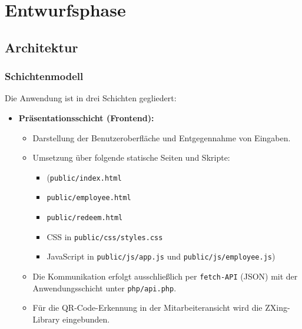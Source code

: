 \section{Entwurfsphase} 
\label{sec:Entwurfsphase}

\subsection{Architektur}

\subsubsection{Schichtenmodell}
Die Anwendung ist in drei Schichten gegliedert:

\begin{itemize}
  \item \textbf{Präsentationsschicht (Frontend):}
  \renewcommand{\labelitemii}{$\rightarrow$} %
  \begin{itemize} 
    \item Darstellung der Benutzeroberfläche und Entgegennahme von Eingaben.  
    \item Umsetzung über folgende statische Seiten und Skripte:
      \begin{itemize}
        \item (\texttt{public/index.html} 
        \item \texttt{public/employee.html}
        \item \texttt{public/redeem.html}
        \item CSS in \texttt{public/css/styles.css}
        \item JavaScript in \texttt{public/js/app.js} und \texttt{public/js/employee.js})
      \end{itemize}
    \item Die Kommunikation erfolgt ausschließlich per \texttt{fetch-API} (\ac{JSON}) mit der Anwendungsschicht unter \texttt{php/api.php}.  
    \item Für die QR-Code-Erkennung in der Mitarbeiteransicht wird die ZXing-Library eingebunden.
  \end{itemize}


\end{itemize}

